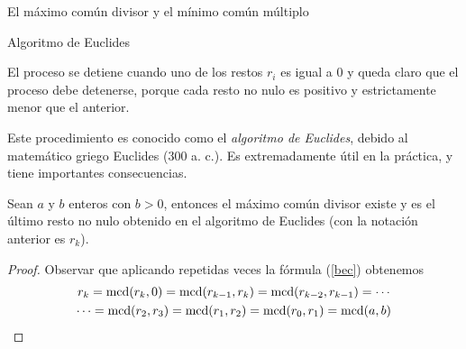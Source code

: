 \begin{section}{El máximo común divisor y el mínimo común múltiplo}
\begin{table}[htbp]
\centering
{}
\caption{Algoritmo de Euclides}
\label{tabla-AE}
\end{table}

El proceso se detiene cuando uno de los restos $r_i$  es igual a $0$ y queda claro que el proceso debe detenerse, porque cada resto no nulo es positivo y estrictamente menor que el anterior.

Este procedimiento es conocido como el \textit{algoritmo de Euclides}, debido al matemático griego Euclides ($300$ a. c.). Es extremadamente útil en la práctica, y tiene importantes consecuencias.


\begin{teorema} Sean  $a$ y $b$ enteros con $b >0$, entonces el máximo común divisor existe y es el último resto no nulo obtenido en el algoritmo de Euclides (con la notación anterior es $r_k$). 
\end{teorema}
\begin{proof}
Observar que aplicando repetidas veces la fórmula (\ref{bec}) obtenemos 
\begin{multline*}
r_k = \operatorname{mcd}(r_{k},0) = \operatorname{mcd}(r_{k-1},r_k) =\operatorname{mcd}(r_{k-2},r_{k-1}) = \cdots\\\cdots 
=  \operatorname{mcd}(r_2,r_3) =  \operatorname{mcd}(r_1,r_2)  =  \operatorname{mcd}(r_0,r_1) = \operatorname{mcd}(a,b)  
\end{multline*}
\end{proof}



\end{section}
